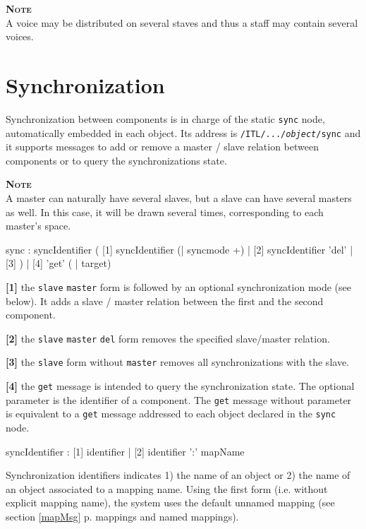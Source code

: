 \documentclass[a4paper,twoside]{report}
\newcommand{\toplevel}[1]	{\chapter{#1}}
\newcommand{\fullref}[1]	{\ref{#1} p.\pageref{#1}}
\newcommand{\OSC}[1]		{\texttt{#1}}
\newcommand{\note}	[1]		{\vspace{2mm}\textbf{\hspace{-1.03cm}\textbf{\textsc{Note #1}}}}
\let\olditemize\itemize
\let\oldenditemize\enditemize
\renewenvironment{itemize} 	{\olditemize \setlength{\itemsep}{1mm}}{\oldenditemize}
\begin{document}
\note{} \\
A voice may be distributed on several staves and thus a staff may contain several voices.


\toplevel{Synchronization}
\label{syncmsg}

Synchronization between components is in charge of the static \OSC{sync} node, automatically embedded in each object. Its address is \OSC{/ITL/.../\textit{object}/sync} and it supports messages to add or remove a master / slave relation between components or to query the synchronizations state.

\note{} \\
A master can naturally have several slaves, but a slave can have several masters as well. In this case, it will be drawn several times, corresponding to each master's space.

\begin{rail}
sync : syncIdentifier 
	 ( [1] syncIdentifier (| syncmode +) 
	   | [2] syncIdentifier 'del'
	   | [3] )
	   | [4] 'get' ( | target)
\end{rail}


\begin{itemize}
\item \textbf{[1]} the \OSC{slave} \OSC{master} form is followed by an optional synchronization mode (see below). It adds a slave / master relation between the first and the second component.
\item \textbf{[2]} the \OSC{slave} \OSC{master} \OSC{del} form removes the specified slave/master relation.
\item \textbf{[3]} the \OSC{slave} form without \OSC{master} removes all synchronizations with the slave.
\item \textbf{[4]} the \OSC{get} message is intended to query the synchronization state. The optional parameter is the identifier of a component. The \OSC{get} message without parameter is equivalent to a \OSC{get} message addressed to each object declared in the \OSC{sync} node.
\end{itemize}

\begin{rail}
syncIdentifier : [1] identifier 
		| [2] identifier ':' mapName
\end{rail}

Synchronization identifiers indicates 1) the name of an object or 2) the name of an object associated to a mapping name. Using the first form (i.e. without explicit mapping name), the system uses the default unnamed mapping (see section \fullref{mapMsg} mappings and named mappings).
\end{document}
